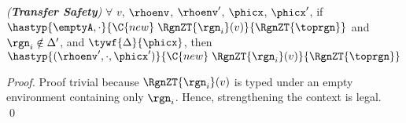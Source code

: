 \begin{theorem}
\emph{(\textbf{Transfer Safety})}
\label{thm:fb-transfer-safety-stmt}
$\forall$ $v$, $\rhoenv$, $\rhoenv'$, $\phicx$, $\phicx'$, if
$\hastyp{\emptyA, \cdot}{\C{new}\;
\RgnZT{\rgn_i}(v)}{\RgnZT{\toprgn}}$ and $\rgn_i \notin \Delta'$, and
$\tywf{\Delta}{\phicx}$, then $\hastyp{(\rhoenv',\cdot,\phicx')}
{\C{new}\; \RgnZT{\rgn_i}(v)}{\RgnZT{\toprgn}}$
\end{theorem}
\begin{proof}
Proof trivial because $\RgnZT{\rgn_i}(v)$ is typed under an empty
environment containing only $\rgn_i$. Hence, strengthening the context
is legal. 
\qed
\end{proof}
